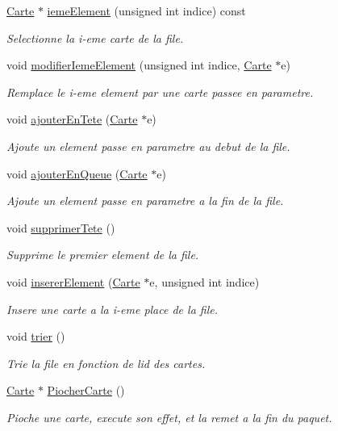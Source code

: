 \begin{DoxyCompactItemize}
\hyperlink{classCarte}{Carte} $\ast$ \hyperlink{classPaquetChance_a62c4da96b6b93031f38c3c5a4cd78135}{ieme\+Element} (unsigned int indice) const 
\begin{DoxyCompactList}\small\item\em Selectionne la i-\/eme carte de la file. \end{DoxyCompactList}\item 
void \hyperlink{classPaquetChance_a1c7104a9ff1259cc2a45fdc0b7134819}{modifier\+Ieme\+Element} (unsigned int indice, \hyperlink{classCarte}{Carte} $\ast$e)
\begin{DoxyCompactList}\small\item\em Remplace le i-\/eme element par une carte passee en parametre. \end{DoxyCompactList}\item 
void \hyperlink{classPaquetChance_ab46d1935463a61fc90fc0ae804aace0e}{ajouter\+En\+Tete} (\hyperlink{classCarte}{Carte} $\ast$e)
\begin{DoxyCompactList}\small\item\em Ajoute un element passe en parametre au debut de la file. \end{DoxyCompactList}\item 
void \hyperlink{classPaquetChance_ad4dc4397949178b400a6a3d900901876}{ajouter\+En\+Queue} (\hyperlink{classCarte}{Carte} $\ast$e)
\begin{DoxyCompactList}\small\item\em Ajoute un element passe en parametre a la fin de la file. \end{DoxyCompactList}\item 
void \hyperlink{classPaquetChance_a84fe7a3d65941d9a4b2bb5c11a921447}{supprimer\+Tete} ()
\begin{DoxyCompactList}\small\item\em Supprime le premier element de la file. \end{DoxyCompactList}\item 
void \hyperlink{classPaquetChance_a54a91cae366f6d9d42ca2ab577e4be6c}{inserer\+Element} (\hyperlink{classCarte}{Carte} $\ast$e, unsigned int indice)
\begin{DoxyCompactList}\small\item\em Insere une carte a la i-\/eme place de la file. \end{DoxyCompactList}\item 
void \hyperlink{classPaquetChance_ad40f530029945fe7be21c780af927c12}{trier} ()
\begin{DoxyCompactList}\small\item\em Trie la file en fonction de l\textquotesingle{}id des cartes. \end{DoxyCompactList}\item 
\hyperlink{classCarte}{Carte} $\ast$ \hyperlink{classPaquetChance_ab7c14484bb86c08e665391588f477b59}{Piocher\+Carte} ()
\begin{DoxyCompactList}\small\item\em Pioche une carte, execute son effet, et la remet a la fin du paquet. \end{DoxyCompactList}\end{DoxyCompactItemize}
